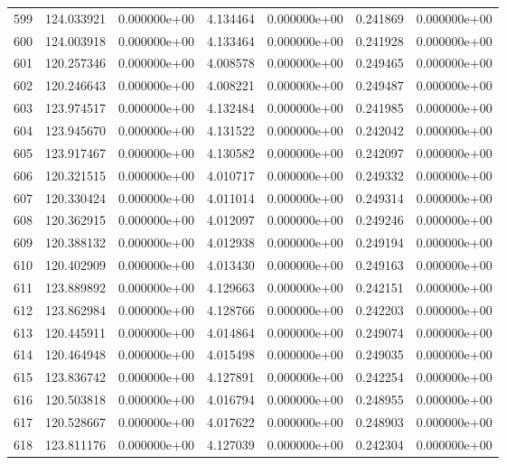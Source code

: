 \begin{tabular}{rrrrrrr}
 599 & 124.033921 &  0.000000e+00 &  4.134464 &  0.000000e+00 &   0.241869 &  0.000000e+00 \\
 600 & 124.003918 &  0.000000e+00 &  4.133464 &  0.000000e+00 &   0.241928 &  0.000000e+00 \\
 601 & 120.257346 &  0.000000e+00 &  4.008578 &  0.000000e+00 &   0.249465 &  0.000000e+00 \\
 602 & 120.246643 &  0.000000e+00 &  4.008221 &  0.000000e+00 &   0.249487 &  0.000000e+00 \\
 603 & 123.974517 &  0.000000e+00 &  4.132484 &  0.000000e+00 &   0.241985 &  0.000000e+00 \\
 604 & 123.945670 &  0.000000e+00 &  4.131522 &  0.000000e+00 &   0.242042 &  0.000000e+00 \\
 605 & 123.917467 &  0.000000e+00 &  4.130582 &  0.000000e+00 &   0.242097 &  0.000000e+00 \\
 606 & 120.321515 &  0.000000e+00 &  4.010717 &  0.000000e+00 &   0.249332 &  0.000000e+00 \\
 607 & 120.330424 &  0.000000e+00 &  4.011014 &  0.000000e+00 &   0.249314 &  0.000000e+00 \\
 608 & 120.362915 &  0.000000e+00 &  4.012097 &  0.000000e+00 &   0.249246 &  0.000000e+00 \\
 609 & 120.388132 &  0.000000e+00 &  4.012938 &  0.000000e+00 &   0.249194 &  0.000000e+00 \\
 610 & 120.402909 &  0.000000e+00 &  4.013430 &  0.000000e+00 &   0.249163 &  0.000000e+00 \\
 611 & 123.889892 &  0.000000e+00 &  4.129663 &  0.000000e+00 &   0.242151 &  0.000000e+00 \\
 612 & 123.862984 &  0.000000e+00 &  4.128766 &  0.000000e+00 &   0.242203 &  0.000000e+00 \\
 613 & 120.445911 &  0.000000e+00 &  4.014864 &  0.000000e+00 &   0.249074 &  0.000000e+00 \\
 614 & 120.464948 &  0.000000e+00 &  4.015498 &  0.000000e+00 &   0.249035 &  0.000000e+00 \\
 615 & 123.836742 &  0.000000e+00 &  4.127891 &  0.000000e+00 &   0.242254 &  0.000000e+00 \\
 616 & 120.503818 &  0.000000e+00 &  4.016794 &  0.000000e+00 &   0.248955 &  0.000000e+00 \\
 617 & 120.528667 &  0.000000e+00 &  4.017622 &  0.000000e+00 &   0.248903 &  0.000000e+00 \\
 618 & 123.811176 &  0.000000e+00 &  4.127039 &  0.000000e+00 &   0.242304 &  0.000000e+00 \\

\end{tabular}
